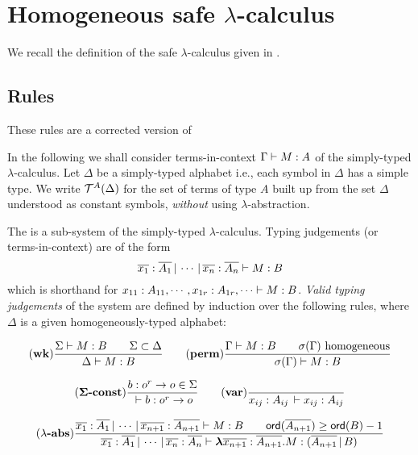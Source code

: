 \section{Homogeneous safe $\lambda$-calculus}
\label{sec:safe_alt}

We recall the definition of the safe $\lambda$-calculus given in
\cite{Ong2005}.

\subsection{Rules}

These rules are a corrected version of
\cite{DBLP:conf/fossacs/AehligMO05}

In the following we shall consider terms-in-context ${{\Gamma} \vdash {M
: A}}$ of the simply-typed $\lambda$-calculus. Let $\Delta$ be a
simply-typed alphabet i.e., each symbol in $\Delta$ has a simple
type. We write ${\cal T}^{A}(\Delta)$ for the set of terms of type $A$
built up from the set $\Delta$ understood as constant symbols,
\emph{without} using $\lambda$-abstraction.


The  is a sub-system of the
simply-typed $\lambda$-calculus. Typing judgements (or
terms-in-context) are of the form
\begin{equation}
\nonumber {{\overline{x_1}:\overline{A_1} \, | \, \cdots \, | \,
\overline{x_n} :  \overline{A_n}} \vdash {M : B}}
\end{equation}
which is shorthand for ${{x_{11} : A_{11}, \cdots, x_{1r}:
A_{1r}, \cdots} \vdash {M : B}}$. \emph{Valid typing judgements} of the
system are defined by induction over the following rules, where
$\Delta$ is a given homogeneously-typed alphabet:

\[ (\mbox{\textbf{wk}})
{    { {{\Sigma} \vdash {M:B}} \qquad {\Sigma \subset \Delta} }
    \over
        { {{\Delta } \vdash {M : B}}}
   }
\qquad
    (\mbox{\textbf{perm}})
  {
      { {{\Gamma} \vdash {M:B}} \qquad \sigma(\Gamma) \hbox{ homogeneous} }
    \over
      { {{\sigma(\Gamma)} \vdash {M : B}} }
    }
\]


\[ (\mathbf{\Sigma}\mbox{\textbf{-const}})    {   {b : o^r \rightarrow o \in \Sigma } \over {{{} \vdash {b : o^r \rightarrow o}}}}
\qquad
 (\mbox{\textbf{var}}) { \over
{{{x_{ij} : A_{ij}\, } \vdash {x_{ij} :
A_{ij}}}}}\]

\[ (\mbox{$\mathbf{\lambda}$\textbf{-abs}})
{ {{{\overline{x_1} : \overline{A_1}\, | \, \cdots\, | \,
\overline{x_{n+1}} : \overline{A_{n+1}}} \vdash {M : B}}} \qquad
{\sf ord}(\overline{A_{n+1}}) \geq {\sf ord}(B) -1 \over {{{\overline{x_1} :
\overline{A_1}\, | \, \cdots\, | \, \overline{x_{n}} :
\overline{A_{n}}} \vdash {{\hbox{\boldmath $\lambda$}{\overline{x_{n+1}} : \overline{A_{n+1}}}.{M}}
: (\overline{A_{n+1}} \, | \, B)}}} } \]

